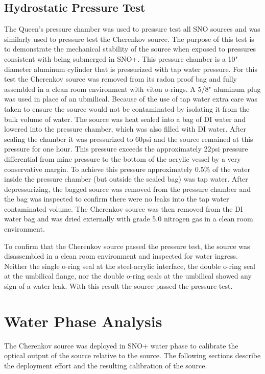 \subsection{Hydrostatic Pressure Test}

The Queen's pressure chamber was used to pressure test all SNO sources and was similarly used to pressure test the Cherenkov source. 
The purpose of this test is to demonstrate the mechanical stability of the source when exposed to pressures consistent with being submerged in SNO+.
This pressure chamber is a 10" diameter aluminum cylinder that is pressurized with tap water pressure. For this test the Cherenkov source was removed from its radon proof bag and fully assembled in a clean room environment with viton o-rings. A 5/8" aluminum plug was used in place of an ubmilical. Because of the use of tap water extra care was taken to ensure the source would not be contaminated by isolating it from the bulk volume of water. The source was heat sealed into a bag of DI water and lowered into the pressure chamber, which was also filled with DI water. After sealing the chamber it was pressurized to 60psi and the source remained at this pressure for one hour. This pressure exceeds the approximately 22psi pressure differential from mine pressure to the bottom of the acrylic vessel by a very conservative margin. To achieve this pressure approximately $0.5\%$ of the water inside the pressure chamber (but outside the sealed bag) was tap water. After depressurizing, the bagged source was removed from the pressure chamber and the bag was inspected to confirm there were no leaks into the tap water contaminated volume. The Cherenkov source was then removed from the DI water bag and was dried externally with grade 5.0 nitrogen gas in a clean room environment. 

To confirm that the Cherenkov source passed the pressure test, the source was disassembled in a clean room environment and inspected for water ingress. Neither the single o-ring seal at the steel-acrylic interface, the double o-ring seal at the umbilical flange, nor the double o-ring seals at the umbilical showed any sign of a water leak. With this result the source passed the pressure test.

\section{Water Phase Analysis}
\label{chap:water_phase}
The Cherenkov source was deployed in SNO+ water phase to calibrate the optical output of the source relative to the \N source.
The following sections describe the deployment effort and the resulting calibration of the source.

